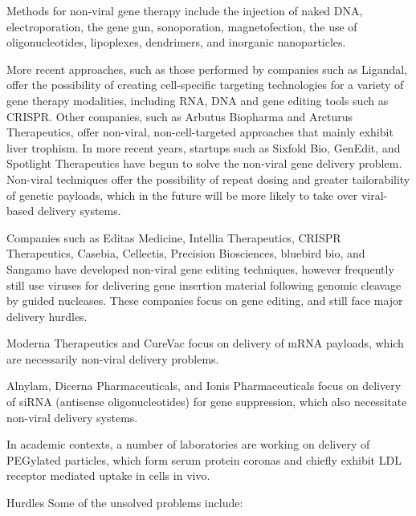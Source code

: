 Methods for non-viral gene therapy include the injection of naked DNA, electroporation, the gene gun, sonoporation, magnetofection, the use of oligonucleotides, lipoplexes, dendrimers, and inorganic nanoparticles.

More recent approaches, such as those performed by companies such as Ligandal, offer the possibility of creating cell-specific targeting technologies for a variety of gene therapy modalities, including RNA, DNA and gene editing tools such as CRISPR. Other companies, such as Arbutus Biopharma and Arcturus Therapeutics, offer non-viral, non-cell-targeted approaches that mainly exhibit liver trophism. In more recent years, startups such as Sixfold Bio, GenEdit, and Spotlight Therapeutics have begun to solve the non-viral gene delivery problem. Non-viral techniques offer the possibility of repeat dosing and greater tailorability of genetic payloads, which in the future will be more likely to take over viral-based delivery systems.

Companies such as Editas Medicine, Intellia Therapeutics, CRISPR Therapeutics, Casebia, Cellectis, Precision Biosciences, bluebird bio, and Sangamo have developed non-viral gene editing techniques, however frequently still use viruses for delivering gene insertion material following genomic cleavage by guided nucleases. These companies focus on gene editing, and still face major delivery hurdles.

Moderna Therapeutics and CureVac focus on delivery of mRNA payloads, which are necessarily non-viral delivery problems.

Alnylam, Dicerna Pharmaceuticals, and Ionis Pharmaceuticals focus on delivery of siRNA (antisense oligonucleotides) for gene suppression, which also necessitate non-viral delivery systems.

In academic contexts, a number of laboratories are working on delivery of PEGylated particles, which form serum protein coronas and chiefly exhibit LDL receptor mediated uptake in cells in vivo.

Hurdles
Some of the unsolved problems include:

